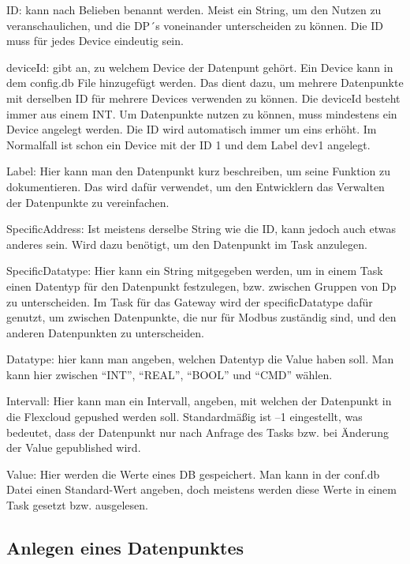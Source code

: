 \begin{compactitem}
    \item ID: kann nach Belieben benannt werden. Meist ein String, um den Nutzen zu veranschaulichen, und die DP´s voneinander unterscheiden zu können. Die ID muss für jedes Device eindeutig sein.
    \item deviceId: gibt an, zu welchem Device der Datenpunt gehört. Ein Device kann in dem config.db File hinzugefügt werden. Das dient dazu, um mehrere Datenpunkte mit derselben ID für mehrere Devices verwenden zu können. Die deviceId besteht immer aus einem INT. Um Datenpunkte nutzen zu können, muss mindestens ein Device angelegt werden. Die ID wird automatisch immer um eins erhöht. Im Normalfall ist schon ein Device mit der ID 1 und dem Label dev1 angelegt.
    \item Label: Hier kann man den Datenpunkt kurz beschreiben, um seine Funktion zu dokumentieren. Das wird dafür verwendet, um den Entwicklern das Verwalten der Datenpunkte zu vereinfachen.
    \item SpecificAddress: Ist meistens derselbe String wie die ID, kann jedoch auch etwas anderes sein. Wird dazu benötigt, um den Datenpunkt im Task anzulegen.
    \item SpecificDatatype: Hier kann ein String mitgegeben werden, um in einem Task einen Datentyp für den Datenpunkt festzulegen, bzw. zwischen Gruppen von Dp zu unterscheiden. Im Task für das Gateway wird der specificDatatype dafür genutzt, um zwischen Datenpunkte, die nur für Modbus zuständig sind, und den anderen Datenpunkten zu unterscheiden.
    \item Datatype: hier kann man angeben, welchen Datentyp die Value haben soll. Man kann hier zwischen “INT”, “REAL”, “BOOL” und “CMD” wählen.
    \item Intervall: Hier kann man ein Intervall, angeben, mit welchen der Datenpunkt in die Flexcloud gepushed werden soll. Standardmäßig ist –1 eingestellt, was bedeutet, dass der Datenpunkt nur nach Anfrage des Tasks bzw. bei Änderung der Value gepublished wird.
    \item Value: Hier werden die Werte eines DB gespeichert. Man kann in der conf.db Datei einen Standard-Wert angeben, doch meistens werden diese Werte in einem Task gesetzt bzw. ausgelesen.
\end{compactitem}

\subsection{Anlegen eines Datenpunktes}


